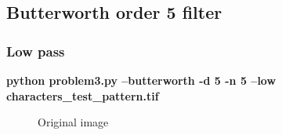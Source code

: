     \pagebreak
    \subsection{Butterworth order 5 filter}

        \subsubsection{Low pass}

        \small{\textbf{python problem3.py --butterworth -d 5 -n 5 --low characters\_test\_pattern.tif}}

        \begin{figure}[!htb]\centering
            \begin{minipage}{0.45\textwidth}
                \caption{\small{Original image}}
            \end{minipage}
            \begin{minipage}{0.45\textwidth}

\end{minipage}
\end{figure}
